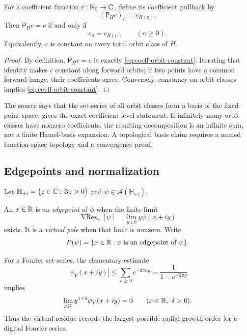 \begin{proposition}
\label{prop:permutation-fixed-coefficients}
For a coefficient function $c:\mathbb N_0\to\mathbb C$, define its coefficient pullback by
\[
 (\mathsf P_Hc)_n=c_{H(n)}.
\]
Then $\mathsf P_Hc=c$ if and only if
\begin{equation}
\label{eq:coeff-orbit-constant}
 c_n=c_{H(n)}\qquad(n\geq0).
\end{equation}
Equivalently, $c$ is constant on every total orbit class of $H$.
\end{proposition}

\begin{proof}
By definition, $\mathsf P_Hc=c$ is exactly
\cref{eq:coeff-orbit-constant}.
Iterating that identity makes $c$ constant along forward orbits; if two
points have a common forward image, their coefficients agree.  Conversely,
constancy on orbit classes implies \cref{eq:coeff-orbit-constant}.
\end{proof}

\begin{sourceissue}
The source says that the set-series of all orbit classes form a basis of the
fixed-point space.   gives the exact
coefficient-level statement.  If infinitely many orbit classes have
nonzero coefficients, the resulting decomposition is an infinite sum, not
a finite Hamel-basis expansion.  A topological basis claim requires a named
function-space topology and a convergence proof.
\end{sourceissue}

\subsection{Edgepoints and normalization}

Let $\mathbb H_{+i}=\{z\in\mathbb C:\Im z>0\}$ and
$\psi\in\mathcal A(\mathbb H_{+i})$.

\begin{definition}
An $x\in\mathbb R$ is an \emph{edgepoint} of $\psi$ when the finite limit
\[
 \operatorname{VRes}_x[\psi]
 =\lim_{y\downarrow0}y\psi(x+iy)
\]
exists.  It is a \emph{virtual pole} when that limit is nonzero.  Write
\[
 P(\psi)=\{x\in\mathbb R:x\text{ is an edgepoint of }\psi\}.
\]
\end{definition}

For a Fourier set-series, the elementary estimate
\[
 |\psi_V(x+iy)|\leq\sum_{n\geq0}e^{-2\pi ny}
 =\frac1{1-e^{-2\pi y}}
\]
implies
\begin{equation}
\label{eq:no-super-simple-growth}
 \lim_{y\downarrow0}y^{1+\delta}\psi_V(x+iy)=0
 \qquad(x\in\mathbb R,\ \delta>0).
\end{equation}
Thus the virtual residue records the largest possible radial growth order
for a digital Fourier series.

